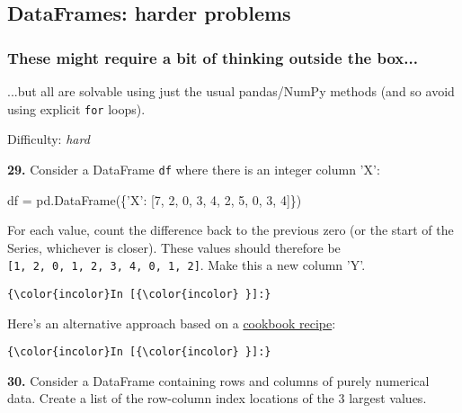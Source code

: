 \documentclass[11pt]{article}
\newenvironment{Shaded}{}{}
\newcommand{\DecValTok}[1]{\textcolor[rgb]{0.25,0.63,0.44}{{#1}}}
\newcommand{\StringTok}[1]{\textcolor[rgb]{0.25,0.44,0.63}{{#1}}}
\newcommand{\NormalTok}[1]{{#1}}
\newcommand{\OperatorTok}[1]{\textcolor[rgb]{0.40,0.40,0.40}{{#1}}}
\begin{document}
    \subsection{DataFrames: harder
problems}\label{dataframes-harder-problems}

\subsubsection{These might require a bit of thinking outside the
box...}\label{these-might-require-a-bit-of-thinking-outside-the-box...}

...but all are solvable using just the usual pandas/NumPy methods (and
so avoid using explicit \texttt{for} loops).

Difficulty: \emph{hard}

    \textbf{29.} Consider a DataFrame \texttt{df} where there is an integer
column 'X':

\begin{Shaded}
\begin{Highlighting}[]
\NormalTok{df }\OperatorTok{=}\NormalTok{ pd.DataFrame(\{}\StringTok{'X'}\NormalTok{: [}\DecValTok{7}\NormalTok{, }\DecValTok{2}\NormalTok{, }\DecValTok{0}\NormalTok{, }\DecValTok{3}\NormalTok{, }\DecValTok{4}\NormalTok{, }\DecValTok{2}\NormalTok{, }\DecValTok{5}\NormalTok{, }\DecValTok{0}\NormalTok{, }\DecValTok{3}\NormalTok{, }\DecValTok{4}\NormalTok{]\})}
\end{Highlighting}
\end{Shaded}

For each value, count the difference back to the previous zero (or the
start of the Series, whichever is closer). These values should therefore
be \texttt{{[}1,\ 2,\ 0,\ 1,\ 2,\ 3,\ 4,\ 0,\ 1,\ 2{]}}. Make this a new
column 'Y'.

    \begin{Verbatim}[commandchars=\\\{\}]
{\color{incolor}In [{\color{incolor} }]:} 
\end{Verbatim}


    Here's an alternative approach based on a
\href{http://pandas.pydata.org/pandas-docs/stable/cookbook.html\#grouping}{cookbook
recipe}:

    \begin{Verbatim}[commandchars=\\\{\}]
{\color{incolor}In [{\color{incolor} }]:} 
\end{Verbatim}


    \textbf{30.} Consider a DataFrame containing rows and columns of purely
numerical data. Create a list of the row-column index locations of the 3
largest values.
\end{document}
